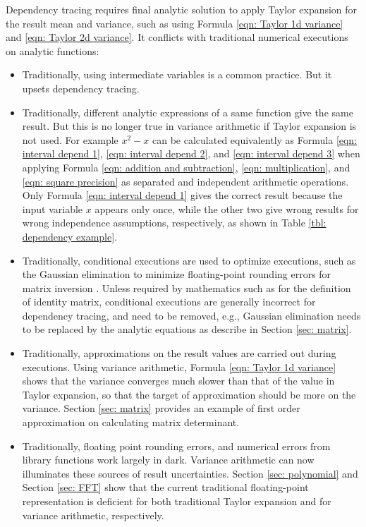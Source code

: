 \documentclass[twoside]{article}
\numberwithin{equation}{section}
\begin{document}
Dependency tracing requires final analytic solution to apply Taylor expansion for the result mean and variance, such as using Formula \eqref{eqn: Taylor 1d variance} and \eqref{eqn: Taylor 2d variance}.
It conflicts with traditional numerical executions on analytic functions:
\begin{itemize}

\item
Traditionally, using intermediate variables is a common practice.
But it upsets dependency tracing.

\item 
Traditionally, different analytic expressions of a same function give the same result.
But this is no longer true in variance arithmetic if Taylor expansion is not used.
For example $x^2 - x$ can be calculated equivalently as Formula \eqref{eqn: interval depend 1}, \eqref{eqn: interval depend 2}, and \eqref{eqn: interval depend 3} when applying Formula \eqref{eqn: addition and subtraction}, \eqref{eqn: multiplication}, and \eqref{eqn: square precision} as separated and independent arithmetic operations.
Only Formula \eqref{eqn: interval depend 1} gives the correct result because the input variable $x$ appears only once, while the other two give wrong results for wrong independence assumptions, respectively, as shown in Table \ref{tbl: dependency example}.

\item
Traditionally, conditional executions are used to optimize executions, such as the Gaussian elimination to minimize floating-point rounding errors for matrix inversion \cite{Linear_Algebra}.  
Unless required by mathematics such as for the definition of identity matrix, conditional executions are generally incorrect for dependency tracing, and need to be removed, e.g., Gaussian elimination needs to be replaced by the analytic equations as describe in Section \ref{sec: matrix}.

\item 
Traditionally, approximations on the result values are carried out during executions.
Using variance arithmetic, Formula \eqref{eqn: Taylor 1d variance} shows that the variance converges much slower than that of the value in Taylor expansion, so that the target of approximation should be more on the variance.
Section \ref{sec: matrix} provides an example of first order approximation on calculating matrix determinant.

\item
Traditionally, floating point rounding errors, and numerical errors from library functions work largely in dark.
Variance arithmetic can now illuminates these sources of result uncertainties.
Section \ref{sec: polynomial} and Section \ref{sec: FFT} show that the current traditional floating-point representation is deficient for both traditional Taylor expansion and for variance arithmetic, respectively.


\end{itemize}
\end{document}

